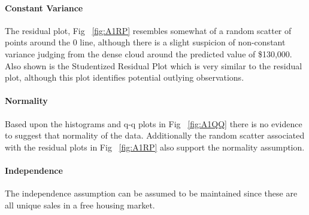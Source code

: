 \documentclass[11pt]{scrartcl} %
\begin{document}
\paragraph{Constant Variance} The residual plot, Fig ~\ref{fig:A1RP} resembles somewhat of a random scatter of points around the 0 line, although there is a slight suspicion of non-constant variance judging from the dense cloud around the predicted value of \$130,000. Also shown is the Studentized Residual Plot which is very similar to the residual plot, although this plot identifies potential outlying observations.
\paragraph{Normality} Based upon the histograms and q-q plots in Fig ~\ref{fig:A1QQ} there is no evidence to suggest that normality of the data. Additionally the random scatter associated with the residual plots in Fig ~\ref{fig:A1RP} also support the normality assumption.
\paragraph{Independence} The independence assumption can be assumed to be maintained since these are all unique sales in a free housing market. 
\end{document}
